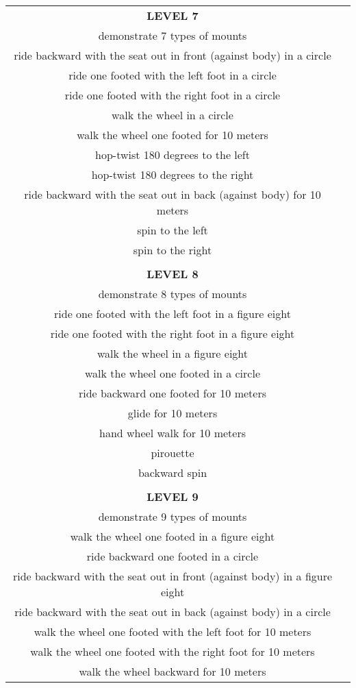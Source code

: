 \begin{tabular}{cc}
\textbf{LEVEL 7}\\
demonstrate 7 types of mounts\\
ride backward with the seat out in front (against body) in a circle\\
ride one footed with the left foot in a circle\\
ride one footed with the right foot in a circle\\
walk the wheel in a circle\\
walk the wheel one footed for 10 meters\\
hop-twist 180 degrees to the left\\
hop-twist 180 degrees to the right\\
ride backward with the seat out in back (against body) for 10 meters\\
spin to the left\\
spin to the right\\\\
\textbf{LEVEL 8}\\
demonstrate 8 types of mounts\\
ride one footed with the left foot in a figure eight\\
ride one footed with the right foot in a figure eight\\
walk the wheel in a figure eight\\
walk the wheel one footed in a circle\\
ride backward one footed for 10 meters\\
glide for 10 meters\\
hand wheel walk for 10 meters\\
pirouette\\
backward spin\\\\
\textbf{LEVEL 9}\\
demonstrate 9 types of mounts\\
walk the wheel one footed in a figure eight\\
ride backward one footed in a circle\\
ride backward with the seat out in front (against body) in a figure eight\\
ride backward with the seat out in back (against body) in a circle\\
walk the wheel one footed with the left foot for 10 meters\\
walk the wheel one footed with the right foot for 10 meters\\
walk the wheel backward for 10 meters\\

\end{tabular}
